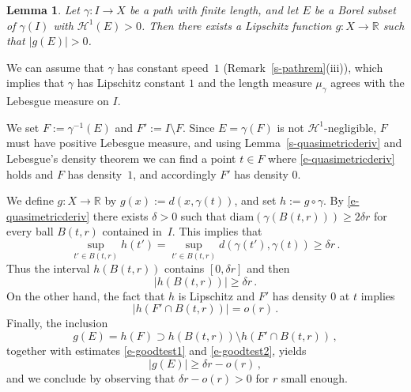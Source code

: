 \documentclass[11pt,reqno,a4paper,final]{amsart}
\makeatletter
\numberwithin{equation}{section}
\theoremstyle{mytheorem}
\newtheorem{lemma}[subsection]{Lemma}
\theoremstyle{myremark}
\theoremstyle{myparagraph}
\renewenvironment{proof}[1][\proofname]{\par 
  \pushQED{\qed}%
  \normalfont \topsep10\p@\@plus6\p@\relax 
  \trivlist 
  \item[\hskip\labelsep 
    \bfseries 
    #1\@addpunct{.}]\ignorespaces 
}{%
  \popQED\endtrivlist\@endpefalse 
}
\providecommand{\proofname}{Proof}
\newcommand{\R}{\mathbb{R}}
\newcommand{\Haus}{\mathscr{H}}
\newcommand{\diam}{\mathrm{diam}}
\makeatother
\begin{document}
\begin{lemma}
\label{s-goodtest}
Let $\gamma:I\to X$ be a path with finite length, 
and let $E$ be a Borel subset of $\gamma(I)$ with $\Haus^1(E)>0$.
Then there exists a Lipschitz function $g:X\to\R$ such that
$|g(E)|>0$.
\end{lemma}

\begin{proof}
We can assume that $\gamma$ has constant speed~$1$
(Remark~\ref{s-pathrem}(iii)), which implies that
$\gamma$ has Lipschitz constant $1$ and the length 
measure $\mu_\gamma$ agrees with the Lebesgue measure
on $I$.

We set $F:=\gamma^{-1}(E)$ and $F':=I\setminus F$.
Since $E=\gamma(F)$ is not $\Haus^1$-negligible,
$F$ must have positive Lebesgue measure, and 
using Lemma~\ref{s-quasimetricderiv} and Lebesgue's density theorem 
we can find a point $t\in F$ where \eqref{e-quasimetricderiv} holds
and $F$ has density~$1$, and accordingly $F'$ has density $0$.

We define $g:X\to\R$ by $g(x) := d(x,\gamma(t))$, 
and set $h:=g\circ\gamma$.
By \eqref{e-quasimetricderiv} there exists 
$\delta>0$ such that $\diam(\gamma(B(t,r))) \ge 2\delta r$
for every ball $B(t,r)$ contained in~$I$. 
This implies that
\[
\sup_{t'\in B(t,r)} h(t') =
\sup_{t'\in B(t,r)} d(\gamma(t'),\gamma(t))
\ge \delta r
\, .
\]
Thus the interval $h(B(t,r))$ contains $[0,\delta r]$ and then
%
\begin{equation}
\label{e-goodtest1}
\big| h(B(t,r)) \big| \ge \delta r
\, .
\end{equation}
%
On the other hand, the fact that $h$ is Lipschitz 
and $F'$ has density $0$ at $t$ implies
%
\begin{equation}
\label{e-goodtest2}
\big| h (F'\cap B(t,r)) \big| = o(r)
\, .
\end{equation}
%
Finally, the inclusion 
\[
g(E) =h(F) 
\supset h(B(t,r)) \setminus h(F'\cap B(t,r))
\, ,
\]
together with estimates \eqref{e-goodtest1} and \eqref{e-goodtest2}, yields
\[
|g(E)| \ge \delta r - o(r)
\,  , 
\]
and we conclude by observing that $\delta r - o(r)>0$ 
for $r$ small enough.
\end{proof}
\end{document}
